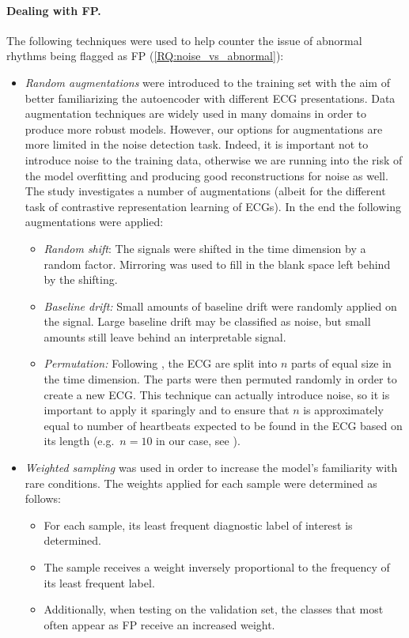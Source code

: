 \documentclass[a4paper,10pt]{article}
\begin{document}
\paragraph{Dealing with FP.} The following techniques were used to help counter the issue of abnormal rhythms being flagged as FP (\ref{RQ:noise_vs_abnormal}):
\begin{itemize}
	\item \emph{Random augmentations} were introduced to the training set with the aim of better familiarizing the autoencoder with different ECG presentations. Data augmentation techniques are widely used in many domains in order to produce more robust models. However, our options for augmentations are more limited in the noise detection task. Indeed, it is important not to introduce noise to the training data, otherwise we are running into the risk of the model overfitting and producing good reconstructions for noise as well. The study \cite{augmentations} investigates a number of augmentations (albeit for the different task of contrastive representation learning of ECGs). In the end the following augmentations were applied:
	      \begin{itemize}
		      \item \emph{Random shift}: The signals were shifted in the time dimension by a random factor. Mirroring was used to fill in the blank space left behind by the shifting.
		      \item \emph{Baseline drift:} Small amounts of baseline drift were randomly applied on the signal. Large baseline drift may be classified as noise, but small amounts still leave behind an interpretable signal.
		      \item \emph{Permutation:} Following \cite{augmentations}, the ECG are split into $n$ parts of equal size in the time dimension. The parts were then permuted randomly in order to create a new ECG. This technique can actually introduce noise, so it is important to apply it sparingly and to ensure that $n$ is approximately equal to  number of heartbeats expected to be found in the ECG based on its length (e.g.\ $n=10$ in our case, see \cite{augmentations}).
	      \end{itemize}
	\item \emph{Weighted sampling} was used in order to increase the model's familiarity with rare conditions. The weights applied for each sample were determined as follows:
	      \begin{itemize}
		      \item For each sample, its least frequent diagnostic label of interest is determined.
		      \item The sample receives a weight inversely proportional to the frequency of its least frequent label.
		      \item Additionally, when testing on the validation set, the classes that most often appear as FP receive an increased weight.
	      \end{itemize}
\end{itemize}
\end{document}

